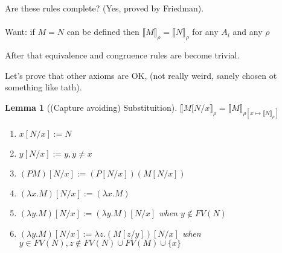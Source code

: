 \documentclass[a4paper,10pt]{book}
\newtheorem{lemma}{Lemma}
\newcommand{\sem}[2]{ \llbracket#1\rrbracket_{#2} }
\begin{document}
Are these rules complete? (Yes, proved by Friedman).

\paragraph{}
Want: if $M=N$ can be defined then $\sem{M}{\rho} = \llbracket N \rrbracket_\rho$ for any $A_i$  and any $\rho$

After that equivalence and congruence rules are become trivial.

Let's prove that other axioms are OK, (not really weird, sanely chosen ot something like tath).




\begin{lemma}[(Capture avoiding) Substituition]
$\llbracket M[N/x\rrbracket_\rho = \llbracket M\rrbracket_{\rho[x \mapsto \llbracket N\rrbracket_\rho]}$
\begin{enumerate}
\item $x[N/x] := N$
\item $y[N/x] := y, y \neq x$
\item $(PM)[N/x] := (P[N/x]) (M[N/x])$
\item $(\lambda x . M)[N/x] := (\lambda x . M)$
\item $(\lambda y . M)[N/x] := (\lambda y . M)[N/x]$ when $y \not\in FV(N)$
\item $(\lambda y . M)[N/x] := \lambda z . (M[z/y])[N/x]$ when $y \in FV(N), z \not\in FV(N) \cup FV(M) \cup \{x\}$
\end{enumerate}
\end{lemma}


\end{document}
